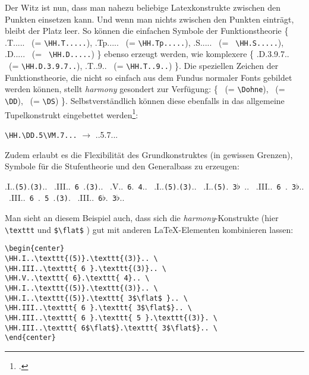 Der Witz ist nun, dass man nahezu beliebige Latexkonstrukte zwischen den Punkten
einsetzen kann. Und wenn man nichts zwischen den Punkten einträgt, bleibt der
Platz leer. So können die einfachen Symbole der Funktionstheorie \{ \HH.T..... 
\ (= \texttt{\small \textbackslash{HH.T.....}}), \HH.Tp.....  \ (=
\texttt{\small \textbackslash{HH.Tp.....}}), \HH.S.....  \ (= \texttt{\small
\textbackslash{HH.S.....}}), \HH.D.....  \ (= \texttt{\small
\textbackslash{HH.D.....}}) \} ebenso erzeugt werden, wie komplexere \{
\HH.D.3.9.7..  \ (= \texttt{\small \textbackslash{HH.D.3.9.7..}}),
\HH.T..9..  \ (= \texttt{\small \textbackslash{HH.T..9..}}) \}.
Die speziellen Zeichen der Funktionstheorie, die nicht so einfach aus dem Fundus
normaler Fonts gebildet werden können, stellt  \textit{harmony} gesondert zur
Verfügung:
\{ \Dohne  \ (= \texttt{\small \textbackslash{Dohne}}), \DD \ (= \texttt{\small
\textbackslash{DD}}), \DS  \ (= \texttt{\small \textbackslash{DS}}) \}.
Selbstverständlich können diese ebenfalls in das allgemeine Tupelkonstrukt
eingebettet werden\footcite[Vgl. dazu][6]{WegWeg2007a}:
\begin{center}
 \texttt{\textbackslash{HH}.\textbackslash{DD}.5\textbackslash{VM}.7...} 
 $\rightarrow$ \HH.\DD.5\VM.7...
\end{center}

Zudem erlaubt es die Flexibilität des Grundkonstruktes (in gewissen Grenzen),
Symbole für die Stufentheorie und den Generalbass zu erzeugen:

\begin{center}
\HH.I..\texttt{(5)}.\texttt{(3)}.. \ 
\HH.III..\texttt{ 6 }.\texttt{(3)}.. \ 
\HH.V..\texttt{ 6}.\texttt{ 4}.. \ 
\HH.I..\texttt{(5)}.\texttt{(3)}.. \ 
\HH.I..\texttt{(5)}.\texttt{ 3$\flat$ }.. \ 
\HH.III..\texttt{ 6 }.\texttt{ 3$\flat$}.. \ 
\HH.III..\texttt{ 6 }.\texttt{ 5 }.\texttt{(3)}. \ 
\HH.III..\texttt{ 6$\flat$}.\texttt{ 3$\flat$}.. \ 
\end{center}

Man sieht an diesem Beispiel auch, dass sich die \textit{harmony}-Konstrukte (hier
\texttt{\textbackslash{texttt}} und \texttt{\$\textbackslash{flat}\$} ) gut mit
anderen \LaTeX-Elementen kombinieren lassen:
\begin{verbatim}
\begin{center}
\HH.I..\texttt{(5)}.\texttt{(3)}.. \ 
\HH.III..\texttt{ 6 }.\texttt{(3)}.. \ 
\HH.V..\texttt{ 6}.\texttt{ 4}.. \ 
\HH.I..\texttt{(5)}.\texttt{(3)}.. \ 
\HH.I..\texttt{(5)}.\texttt{ 3$\flat$ }.. \ 
\HH.III..\texttt{ 6 }.\texttt{ 3$\flat$}.. \ 
\HH.III..\texttt{ 6 }.\texttt{ 5 }.\texttt{(3)}. \ 
\HH.III..\texttt{ 6$\flat$}.\texttt{ 3$\flat$}.. \ 
\end{center}
\end{verbatim}

